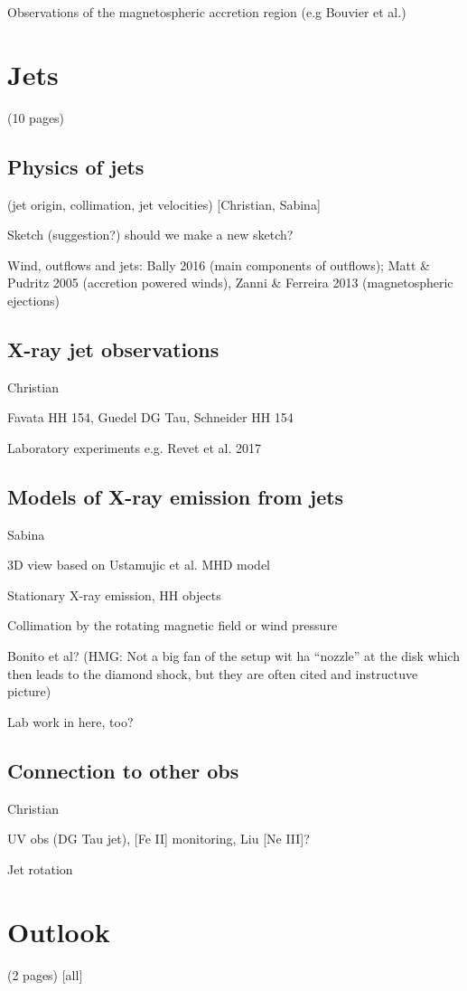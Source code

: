 \documentclass[graybox, nosecnum]{svmult}
\begin{document}
 Observations of the magnetospheric accretion region (e.g Bouvier et al.)


\section{Jets}
         (10 pages)
\subsection{Physics of jets}
(jet origin, collimation, jet velocities) [Christian, Sabina]

Sketch (suggestion?) should we make a new sketch?

Wind, outflows and jets: Bally 2016 (main components of outflows); Matt & Pudritz 2005 (accretion powered winds), Zanni & Ferreira 2013 (magnetospheric ejections)


\subsection{X-ray jet observations}
Christian

Favata HH 154, Guedel DG Tau, Schneider HH 154

Laboratory experiments  e.g. Revet et al. 2017

\subsection{Models of X-ray emission from jets}
Sabina

3D view based on Ustamujic et al. MHD model

Stationary X-ray emission, HH objects

Collimation by the rotating magnetic field or wind pressure

Bonito et al? (HMG: Not a big fan of the setup wit ha ``nozzle'' at the disk which then leads to the diamond shock, but they are often cited and instructuve picture) 

Lab work in here, too?

\subsection{Connection to other obs}
Christian

UV obs (DG Tau jet), [Fe II] monitoring, Liu [Ne III]?

Jet rotation

\section{Outlook}
(2 pages) [all]
\end{document}
